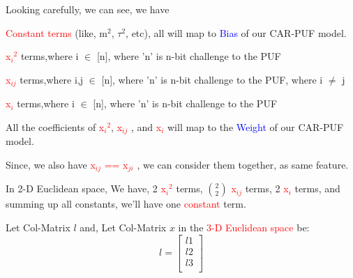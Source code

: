 \documentclass[11 pt]{article}
\begin{document}
{\vspace{\baselineskip}
Looking carefully, we can see, we have

\textbullet \hspace{0.3 cm} \textcolor{red}{Constant terms} (like, m$^2$, $\tau$$^2$, etc), all will map to \textcolor{blue}{Bias} of our CAR-PUF model.

\textbullet \hspace{0.3 cm} \textcolor{red}{x$_i$$^2$} terms,where i $\in$ [n], where 'n' is n-bit challenge to the PUF 

\textbullet \hspace{0.3 cm} \textcolor{red}{x$_{ij}$ } terms,where i,j $\in$ [n], where 'n' is n-bit challenge to the PUF, where i $\neq$ j

\textbullet \hspace{0.3 cm} \textcolor{red}{x$_i$} terms,where i $\in$ [n], where 'n' is n-bit challenge to the PUF

\textbullet \hspace{0.3 cm} All the coefficients of \textcolor{red}{x$_i$$^2$}, \textcolor{red}{x$_{ij}$ }, and \textcolor{red}{x$_i$} will map to the \textcolor{blue}{Weight} of our CAR-PUF model.

\textbullet \hspace{0.3 cm}  Since, we also have \textcolor{red}{x$_{ij}$  == x$_{ji}$  }, we can consider them together, as same feature.

\textbullet \hspace{0.3 cm} In 2-D Euclidean space, We have, 2 \textcolor{red}{x$_{i}$$^2$} terms, {\Large$\binom{2}{2}$} \textcolor{red}{x$_{ij}$} terms, 2 \textcolor{red}{x$_i$} terms, and summing up all constants, we'll have one \textcolor{red}{constant} term.  

\vspace{\baselineskip}

\newcommand{\aaaa}{%
\begin{bmatrix}
    l1 \\
    l2 \\
    l3 \\
\end{bmatrix}%
}

\vspace{\baselineskip}

Let Col-Matrix $l$ and, Let Col-Matrix $x$ in the \textcolor{red}{ 3-D Euclidean space } be:
\[
l = \aaaa
\]

\newcommand{\aaab}{%
\begin{bmatrix}
    x1 \\
    x2 \\
    x3 \\
\end{bmatrix}%
}

}
\end{document}
